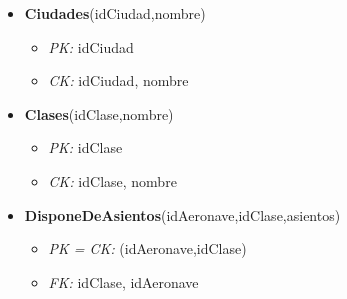 \begin{itemize}
\begin{itemize}
		\end{itemize}
	\item \textbf{Ciudades}(idCiudad,nombre)
		\begin{itemize}
			\item \textit{PK: } idCiudad
			\item \textit{CK: } idCiudad, nombre
		\end{itemize}
	\item \textbf{Clases}(idClase,nombre)
		\begin{itemize}
			\item \textit{PK: } idClase
			\item \textit{CK: } idClase, nombre
		\end{itemize}
	\item \textbf{DisponeDeAsientos}(idAeronave,idClase,asientos)
		\begin{itemize}
			\item \textit{PK = CK: } (idAeronave,idClase)
			\item \textit{FK: } idClase, idAeronave	
		\end{itemize}
\end{itemize}	
